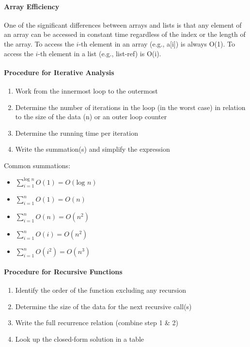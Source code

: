 \documentclass[10pt,letter]{article}
\begin{document}
\paragraph{Array Efficiency} One of the significant differences between arrays and lists is that any element of an array can be accessed in constant time regardless of the index or the length of the array. To access the $i$-th element in an array (e.g., a[i]) is always O(1). To access the $i$-th element in a list (e.g., list-ref) is O(i).

\paragraph{Procedure for Iterative Analysis} \begin{enumerate}
    \item Work from the innermost loop to the outermost
    \item Determine the number of iterations in the loop (in the worst case) in relation to the size of the data (n) or an outer loop counter
\item Determine the running time per iteration
\item Write the summation(s) and simplify the expression
\end{enumerate}
Common summations: \begin{itemize}
    \item $\sum_{i=1}^{\text{log }n}O(1)=O(\text{log }n)$
    \item $\sum_{i=1}^{n}O(1)=O(n)$
    \item $\sum_{i=1}^{n}O(n)=O(n^2)$
    \item $\sum_{i=1}^{n}O(i)=O(n^2)$
    \item $\sum_{i=1}^{n}O(i^2)=O(n^3)$
\end{itemize}

\paragraph{Procedure for Recursive Functions}\begin{enumerate}
    \item Identify the order of the function excluding any recursion
    \item Determine the size of the data for the next recursive call(s)
    \item Write the full recurrence relation (combine step 1 \& 2)
    \item Look up the closed-form solution in a table
\end{enumerate}
\end{document}
